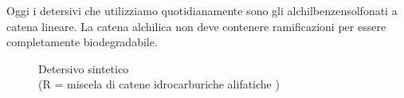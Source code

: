 Oggi i detersivi che utilizziamo quotidianamente sono gli alchilbenzensolfonati a catena lineare. La catena alchilica non deve contenere ramificazioni per essere completamente biodegradabile.

\begin{figure}[H]
	\centering
	\caption[Detersivo sintetico]{Detersivo sintetico\\(R = miscela di catene idrocarburiche alifatiche )}
\end{figure}